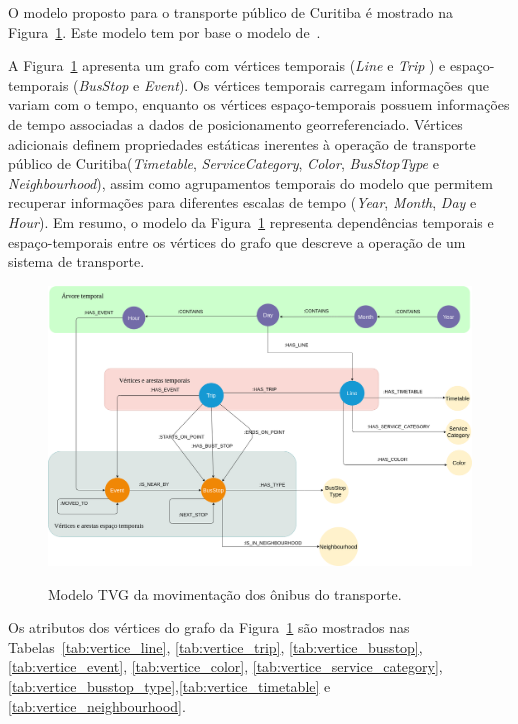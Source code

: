 O modelo proposto para o transporte público de Curitiba é mostrado na Figura~\ref{fig:model}. Este modelo tem por base o modelo de~\cite{wach:19}.

A Figura~\ref{fig:model} apresenta um grafo com vértices temporais (\emph{Line} e \emph{Trip} ) e espaço-temporais (\emph{BusStop} e \emph{Event}). Os vértices temporais carregam informações que variam com o tempo, enquanto os vértices espaço-temporais possuem informações de tempo associadas a dados de posicionamento georreferenciado. Vértices adicionais definem propriedades estáticas inerentes à operação de transporte público de Curitiba(\emph{Timetable}, \emph{ServiceCategory}, \emph{Color}, \emph{BusStopType} e \emph{Neighbourhood}), assim como agrupamentos temporais do modelo que permitem recuperar informações para diferentes escalas de tempo (\emph{Year}, \emph{Month}, \emph{Day} e \emph{Hour}). Em resumo, o modelo da Figura~\ref{fig:model} representa dependências temporais e espaço-temporais entre os vértices do grafo que descreve a operação de um sistema de transporte.

 \begin{figure}[!h]
 \caption{Modelo TVG da movimentação dos ônibus do transporte.}
     \centering
     \includegraphics[scale=.25]{./Capitulo3/img/graph-model.png}
         \label{fig:model}
 \end{figure}
 
 

Os atributos dos vértices do grafo da Figura~\ref{fig:model} são mostrados nas Tabelas~\ref{tab:vertice_line}, \ref{tab:vertice_trip}, \ref{tab:vertice_busstop}, \ref{tab:vertice_event}, \ref{tab:vertice_color}, \ref{tab:vertice_service_category}, \ref{tab:vertice_busstop_type},\ref{tab:vertice_timetable} e \ref{tab:vertice_neighbourhood}. 

